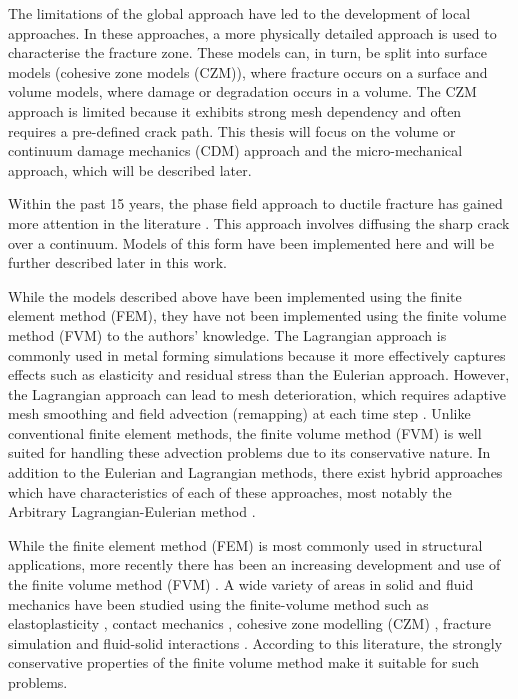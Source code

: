\documentclass[sn-mathphys,Numbered,draft]{sn-jnl}%
\begin{document}
The limitations of the global approach have led to the development of local approaches. In these approaches, a more physically detailed approach is used to characterise the fracture zone. These models can, in turn, be split into surface models (cohesive zone models (CZM)), where fracture occurs on a surface and volume models, where damage or degradation occurs in a volume. The CZM approach is limited because it exhibits strong mesh dependency and often requires a pre-defined crack path. This thesis will focus on the volume or continuum damage mechanics (CDM) approach and the micro-mechanical approach, which will be described later.

Within the past 15 years, the phase field approach to ductile fracture has gained more attention in the literature \cite{ambati_phase-field_2015, borden_phase-field_2016, miehe_phase_2016, dittmann_variational_2018, samaniego_phase-field_2021}. This approach involves diffusing the sharp crack over a continuum. Models of this form have been implemented here and will be further described later in this work.




While the models described above have been implemented using the finite element method (FEM), they have not been implemented using the finite volume method (FVM) to the authors' knowledge.
The Lagrangian approach is commonly used in metal forming simulations because it more effectively captures effects such as elasticity and residual stress than the Eulerian approach.
However, the Lagrangian approach can lead to mesh deterioration, which requires adaptive mesh smoothing and field advection (remapping) at each time step \cite{martins_extrusion_2011, basic_finite_2005}.
Unlike conventional finite element methods, the finite volume method (FVM) is well suited for handling these advection problems due to its conservative nature.
In addition to the Eulerian and Lagrangian methods, there exist hybrid approaches which have characteristics of each of these approaches, most notably the Arbitrary Lagrangian-Eulerian method \cite{maire_cell-centred_2008}.


While the finite element method (FEM) is most commonly used in structural applications, more recently there has been an increasing development and use of the finite volume method (FVM) \cite{cardiff_thirty_2021}. A wide variety of areas in solid and fluid mechanics have been studied using the finite-volume method such as elastoplasticity \cite{demirdzic_finite_1993,clancy_improving_2019,cardiff_lagrangian_2017,cardiff_block-coupled_2016,leonard_numerical_2012,bressan_analysis_2015,maneeratana_development_2000}, contact mechanics \cite{cardiff_block-coupled_2016,cardiff_development_2012,cardiff_development_2014}, cohesive zone modelling (CZM) \cite{safari_interfacial_2016,carolan_arbitrary_2013}, fracture simulation \cite{ivankovic_application_1994} and fluid-solid interactions \cite{martinez-ferrer_efficient_2018,greenshields_unified_2005,giannopapa_linear_2008,greenshields_fluidstructure_2000,schafer_numerical_2001}. According to this literature, the strongly conservative properties of the finite volume method make it suitable for such problems.
\end{document}
